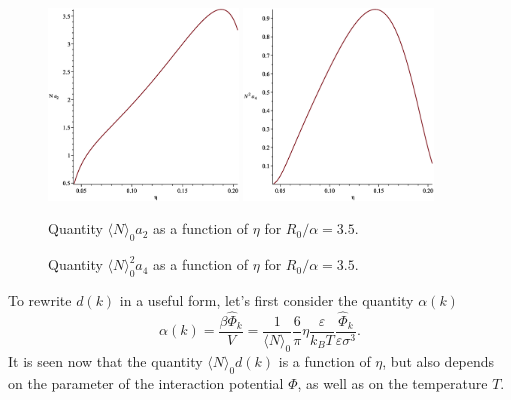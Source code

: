 \begin{figure}[htbp]
	\includegraphics[width=0.45\textwidth,angle=0]{a2_as_function_of_eta} \hfill
	\includegraphics[width=0.45\textwidth,angle=0]{a4_as_function_of_eta} \\
	\parbox{0.5\textwidth}{\caption{\label{fig:a2_vs_eta} Quantity $\langle N \rangle_0 a_2$ as a function of $\eta$ for $R_0/\alpha=3.5$.
	}} \hfill
	\parbox{0.45\textwidth}{\caption{\label{fig:a4_vs_eta} Quantity $\langle N \rangle_0^2 a_4$ as a function of $\eta$ for $R_0/\alpha=3.5$.
	}}
\end{figure}

To rewrite $d(k)$ in a useful form, let's first consider the quantity $\alpha(k)$
\begin{equation}
	\alpha(k) = \frac{\beta \hat{\Phi}_k}{V} = \frac{1}{\langle N \rangle_0} \frac{6}{\pi}\eta \frac{\varepsilon}{k_B T} \frac{\hat{\Phi}_k}{\varepsilon\sigma^3}.
\end{equation}
It is seen now that the quantity $\langle N \rangle_0 d(k)$ is a function of $\eta$, but also depends on the parameter of the interaction potential $\Phi$, as well as on the temperature $T$. 